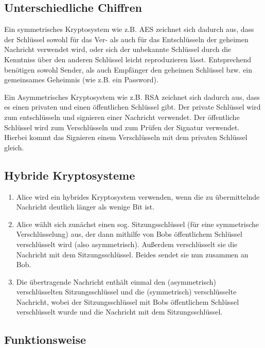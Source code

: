 \documentclass[ngerman]{fbi-aufgabenblatt}
\begin{document}

\subsection{Unterschiedliche Chiffren}

	Ein symmetrisches Kryptosystem wie z.B. AES zeichnet sich dadurch aus, dass der Schlüssel sowohl für das Ver- als auch für das Entschlüsseln der geheimen Nachricht verwendet wird, oder sich der unbekannte Schlüssel durch die Kenntniss über  den anderen Schlüssel leicht reproduzieren lässt. Entsprechend benötigen sowohl Sender, als auch Empfänger den geheimen Schlüssel bzw. ein gemeinsames Geheimnis (wie z.B. ein Password).
	
	Ein Asymmetrisches Kryptosystem wie z.B. RSA zeichnet sich dadurch aus, dass es einen privaten und einen öffentlichen Schlüssel gibt. Der private Schlüssel wird zum entschlüsseln und signieren einer Nachricht verwendet. Der öffentliche Schlüssel wird	zum Verschlüsseln und zum Prüfen der Signatur verwendet. Hierbei kommt das Signieren einem Verschlüsseln mit dem privaten Schlüssel gleich.
	
\subsection{Hybride Kryptosysteme}
	\begin{enumerate}
	 \item Alice wird ein hybrides Kryptosystem verwenden, wenn die zu übermittelnde Nachricht deutlich länger als wenige Bit ist.
	 	
	 \item Alice wählt sich zunächst einen sog. Sitzungsschlüssel (für eine symmetrische Verschlüsselung) aus, der dann mithilfe von Bobs öffentlichem Schlüssel verschlüsselt wird (also asymmetrisch). Außerdem verschlüsselt sie die Nachricht mit dem Sitzungsschlüssel. Beides sendet sie nun zusammen an Bob.
	 	
	 \item Die übertragende Nachricht enthält einmal den (asymmetrisch) verschlüsselten Sitzungsschlüssel und die (symmetrisch) verschlüsselte Nachricht, wobei der Sitzungsschlüssel mit Bobs öffentlichem Schlüssel verschlüsselt wurde und die Nachricht mit dem Sitzungsschlüssel.
	\end{enumerate}
	


\subsection{Funktionsweise}
\end{document}
